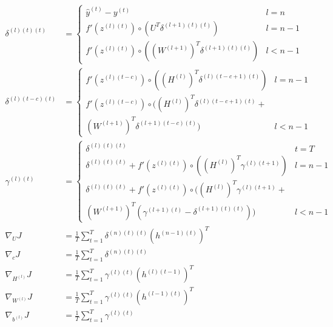 \documentclass{article}
\begin{document}
	\begin{framed}
	\begin{align}
		\delta^{(l)(t)(t)} &=
		\begin{cases}
			\hat{y}^{(t)} - y^{(t)} &l=n\\	
			f'(z^{(l)(t)}) \circ (U^T \delta^{(l+1)(t)(t)}) &l=n-1\\
			f'(z^{(l)(t)}) \circ ((W^{(l+1)})^T \delta^{(l+1)(t)(t)}) &l<n-1
		\end{cases} 
		\\
		\delta^{(l)(t-c)(t)} &=
		\begin{cases}
			f'(z^{(l)(t-c)}) \circ ((H^{(l)})^T \delta^{(l)(t-c+1)(t)}) &l=n-1 \\
			f'(z^{(l)(t-c)}) \circ ((H^{(l)})^T \delta^{(l)(t-c+1)(t)} + \\
			 (W^{(l+1)})^T \delta^{(l+1)(t-c)(t)}) &l<n-1
		\end{cases} 
		\\
		\gamma^{(l)(t)} &= 
		\begin{cases}
		\delta^{(l)(t)(t)} &t=T
		\\
		\delta^{(l)(t)(t)} + f'(z^{(l)(t)}) \circ ((H^{(l)})^T \gamma^{(l)(t+1)}) &l=n-1
		\\
		\delta^{(l)(t)(t)} + f'(z^{(l)(t)}) \circ ((H^{(l)})^T \gamma^{(l)(t+1)} + \\ (W^{(l+1)})^T (\gamma^{(l+1)(t)} - \delta^{(l+1)(t)(t)})) &l<n-1
		\end{cases}
		\\
		\nabla_{U} J &= \frac{1}{T} \sum_{t=1}^{T}\delta^{(n)(t)(t)} (h^{(n-1)(t)})^T\\
		\nabla_{c} J &= \frac{1}{T} \sum_{t=1}^{T}\delta^{(n)(t)(t)} 
		\\
		\nabla_{H^{(l)}} J &= \frac{1}{T} \sum_{t=1}^{T} \gamma^{(l)(t)} (h^{(l)(t-1)})^T
		\\
		\nabla_{W^{(l)}} J &= \frac{1}{T} \sum_{t=1}^{T} \gamma^{(l)(t)} (h^{(l-1)(t)})^T
		\\
		\nabla_{b^{(l)}} J &= \frac{1}{T} \sum_{t=1}^{T} \gamma^{(l)(t)}
	\end{align}
	\end{framed}
\end{document}
